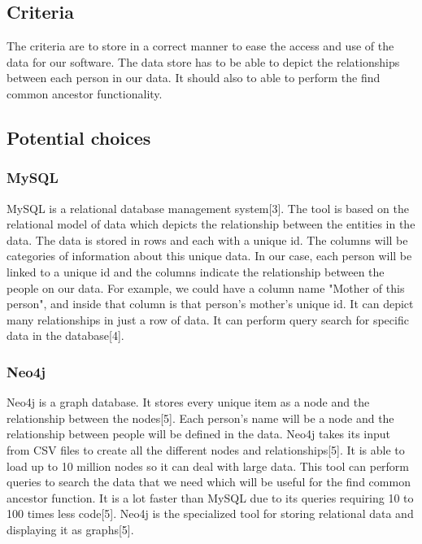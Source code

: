 \documentclass[onecolumn, draftclsnofoot, 10pt, compsoc]{IEEEtran}
\begin{document}
\subsection{Criteria}
\begin{singlespace}
The criteria are to store in a correct manner to ease the access and use of the data for our software. The data store has to be able to depict the relationships between each person in our data. It should also to able to perform the find common ancestor functionality.
\end{singlespace}

\subsection{Potential choices}


\subsubsection{MySQL}
\begin{singlespace}
MySQL is a relational database management system[3]. The tool is based on the relational model of data which depicts the relationship between the entities in the data. The data is stored in rows and each with a unique id. The columns will be categories of information about this unique data. In our case, each person will be linked to a unique id and the columns indicate the relationship between the people on our data. For example, we could have a column name "Mother of this person", and inside that column is that person's mother's unique id. It can depict many relationships in just a row of data. It can perform query search for specific data in the database[4].
\end{singlespace}

\subsubsection{Neo4j}
\begin{singlespace}
Neo4j is a graph database. It stores every unique item as a node and the relationship between the nodes[5]. Each person's name will be a node and the relationship between people will be defined in the data. Neo4j takes its input from CSV files to create all the different nodes and relationships[5]. It is able to load up to 10 million nodes so it can deal with large data. This tool can perform queries to search the data that we need which will be useful for the find common ancestor function. It is a lot faster than MySQL due to its queries requiring 10 to 100 times less code[5]. Neo4j is the specialized tool for storing relational data and displaying it as graphs[5].
\end{singlespace}
 
\end{document}
